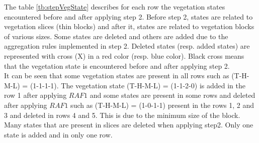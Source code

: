 \documentclass[preprint,3p,times,twocolumn]{elsarticle}
\begin{document}
The table \ref{tb:stepVegState} describes for each row the vegetation states encountered before and after applying step 2. Before step 2, states are related to vegetation slices (thin blocks) and after it, states are related to vegetation blocks of various sizes.
Some states are deleted and others are added due to the aggregation rules implemented in step 2.
Deleted states (resp. added states) are represented with cross (X) in a red color (resp. blue color). Black cross means that the vegetation state is encountered before and after applying step 2. \\
It can be seen that some vegetation states are present in all rows such as (T-H-M-L) = (1-1-1-1). The vegetation state (T-H-M-L) = (1-1-2-0) is added in the row 1 after applying $RAF1$ and some states are present in some rows and deleted after applying $RAF1$ such as (T-H-M-L) = (1-0-1-1) present in the rows 1, 2 and 3 and deleted in rows 4 and 5. This is due to the minimum size of the block. Many states that are present in slices are deleted when applying step2. Only one state is added and in only one row.
\end{document}
